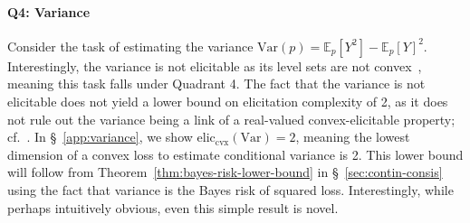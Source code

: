 \documentclass[11pt]{article} %
\newcommand{\eliccvx}{\mathrm{elic}_\mathrm{cvx}}
\newcommand{\E}{\mathbb{E}}
\newcommand{\Var}{\mathrm{Var}}
\begin{document}
\paragraph{Q4: Variance}
Consider the task of estimating the variance $\Var(p) = \E_p[Y^2] - \E_p[Y]^2$.
Interestingly, the variance is not elicitable as its level sets are not convex~\cite{osband1985providing,lambert2008eliciting}, meaning this task falls under Quadrant 4.
The fact that the variance is not elicitable does not yield a lower bound on elicitation complexity of 2, as it does not rule out the variance being a link of a real-valued convex-elicitable property; cf.~\citet[Remark 1]{frongillo2020elicitation}.
In \S~\ref{app:variance}, we show $\eliccvx(\Var)=2$, meaning the lowest dimension of a convex loss to estimate conditional variance is 2. %
This lower bound will follow from Theorem~\ref{thm:bayes-risk-lower-bound} in \S~\ref{sec:contin-consis} using the fact that variance is the Bayes risk of squared loss. %
Interestingly, while perhaps intuitively obvious, even this simple result is novel.
\end{document}
